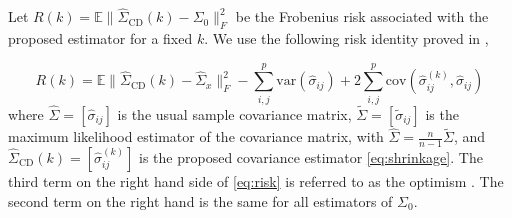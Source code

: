 \documentclass[11pt,oneside]{amsart}
\def\CD{{\mathrm{\scriptscriptstyle CD}}}
\begin{document}
Let $R(k) = \mathbb{E}\|\widehat{\Sigma}_{\CD}(k) - {\Sigma}_0\|_{F}^{2}$ be the Frobenius risk associated with the proposed estimator for a fixed $k$. We use the following risk identity proved in \citet{yi2013sure},

\begin{equation}\label{eq:risk}
R(k) = \mathbb{E}\|\widehat{\Sigma}_{\CD}(k) - {\widehat{\Sigma}}_{x}\|_{F}^{2} - {\displaystyle\sum\limits_{i,j}^{p}}{{{\text{var}}({\widehat{\sigma}}_{ij})}} + 2{\displaystyle\sum\limits_{i,j}^{p}}{{{\text{cov}}({\widehat{\sigma}}_{ij}^{(k)}, {\widehat{\sigma}}_{ij})}}
\end{equation}
where ${\widehat{\Sigma}} = [{\widehat{\sigma}}_{ij}]$ is the usual sample covariance matrix, $\widetilde{\Sigma} = [{\widetilde{\sigma}}_{ij}]$ is the maximum likelihood estimator of the covariance matrix, with ${\widehat{\Sigma}} = \frac{n}{n-1}{\widetilde{\Sigma}}$, and $\widehat{\Sigma}_{\CD}(k) = [{\widehat{\sigma}}_{ij}^{(k)}]$ is the proposed covariance estimator \eqref{eq:shrinkage}. The third term on the right hand side of \eqref{eq:risk}  is referred to as the optimism \citep{efron2004estimation}. The second term on the right hand is the same for all estimators of $\Sigma_0$. 
\end{document}
